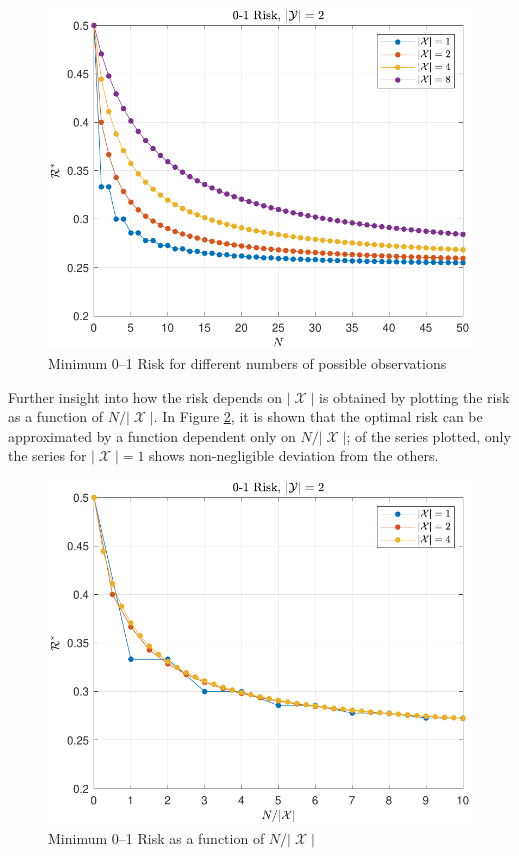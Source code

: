 \documentclass[conference]{IEEEtran}
\DeclareMathOperator{\Xcal}{\mathcal{X}}
\begin{document}
\begin{figure}
\centering
\includegraphics[width=0.9\linewidth]{Risk_01_uni_N_leg_Mx.pdf}
\caption{Minimum 0--1 Risk for different numbers of possible observations}
\label{fig:Risk_01_uni_N_leg_Mx}
\end{figure}

Further insight into how the risk depends on $|\Xcal|$ is obtained by plotting the risk as a function of $N/|\Xcal|$. In Figure \ref{fig:Risk_01_uni_N-Mx}, it is shown that the optimal risk can be approximated by a function dependent only on $N/|\Xcal|$; of the series plotted, only the series for $|\Xcal| = 1$ shows non-negligible deviation from the others.

\begin{figure}
\centering
\includegraphics[width=0.9\linewidth]{Risk_01_uni_N-Mx.pdf}
\caption{Minimum 0--1 Risk as a function of $N/|\Xcal|$}
\label{fig:Risk_01_uni_N-Mx}
\end{figure}
\end{document}
